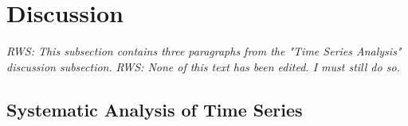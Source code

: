 \documentclass[]{ametsoc}
\begin{document}


\section{Discussion}

\emph{RWS: This subsection contains three paragraphs from the "Time Series Analysis" discussion subsection.}
\emph{RWS: None of this text has been edited. I must still do so.}
\subsection{Systematic Analysis of Time Series}

\end{document}
